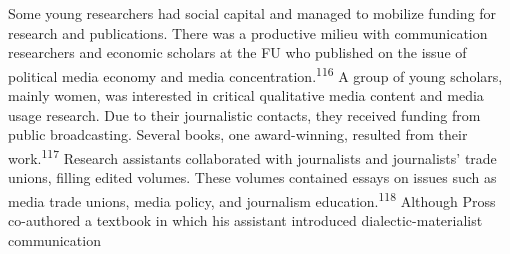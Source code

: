 \documentclass{tufte-handout}
\begin{document}
Some young researchers had social capital and managed to mobilize
funding for research and publications. There was a productive milieu
with communication researchers and economic scholars at the FU who
published on the issue of political media economy and media
concentration.\textsuperscript{116} A group of young scholars, mainly women, was
interested in critical qualitative media content and media usage
research. Due to their journalistic contacts, they received funding from
public broadcasting. Several books, one award-winning, resulted from
their work.\textsuperscript{117} Research
assistants collaborated with journalists and journalists' trade unions,
filling edited volumes. These volumes contained essays on issues such as
media trade unions, media policy, and journalism education.\textsuperscript{118} Although Pross co-authored a textbook in which
his assistant introduced dialectic-materialist communication
\end{document}
